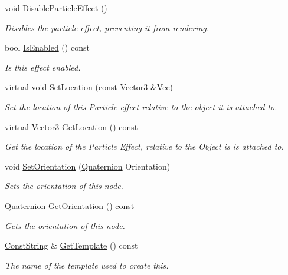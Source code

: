\begin{DoxyCompactItemize}
void \hyperlink{classphys_1_1ParticleEffect_abd9f2339d22582055fe4ae45f986ff8c}{DisableParticleEffect} ()
\begin{DoxyCompactList}\small\item\em Disables the particle effect, preventing it from rendering. \item\end{DoxyCompactList}\item 
bool \hyperlink{classphys_1_1ParticleEffect_aaa4f853811fe2f638d03f09143fd08ca}{IsEnabled} () const 
\begin{DoxyCompactList}\small\item\em Is this effect enabled. \item\end{DoxyCompactList}\item 
virtual void \hyperlink{classphys_1_1ParticleEffect_a4371533c2d1d533208b7bc8a067a67e5}{SetLocation} (const \hyperlink{classphys_1_1Vector3}{Vector3} \&Vec)
\begin{DoxyCompactList}\small\item\em Set the location of this Particle effect relative to the object it is attached to. \item\end{DoxyCompactList}\item 
virtual \hyperlink{classphys_1_1Vector3}{Vector3} \hyperlink{classphys_1_1ParticleEffect_a1776793641c2133def40b572883b4241}{GetLocation} () const 
\begin{DoxyCompactList}\small\item\em Get the location of the Particle Effect, relative to the Object is is attached to. \item\end{DoxyCompactList}\item 
void \hyperlink{classphys_1_1ParticleEffect_aab98a28c2a7984fca81cdfee5e1d2086}{SetOrientation} (\hyperlink{classphys_1_1Quaternion}{Quaternion} Orientation)
\begin{DoxyCompactList}\small\item\em Sets the orientation of this node. \item\end{DoxyCompactList}\item 
\hyperlink{classphys_1_1Quaternion}{Quaternion} \hyperlink{classphys_1_1ParticleEffect_ac3f90a940601fbe0657f5d8eb51f0509}{GetOrientation} () const 
\begin{DoxyCompactList}\small\item\em Gets the orientation of this node. \item\end{DoxyCompactList}\item 
\hyperlink{namespacephys_a5ce5049f8b4bf88d6413c47b504ebb31}{ConstString} \& \hyperlink{classphys_1_1ParticleEffect_a7234a58e42de201111439b58433c2319}{GetTemplate} () const 
\begin{DoxyCompactList}\small\item\em The name of the template used to create this. \item\end{DoxyCompactList}\end{DoxyCompactItemize}


